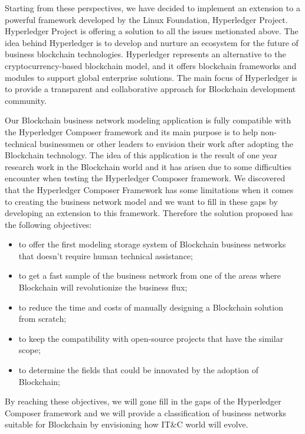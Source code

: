Starting from these perspectives, we have decided to implement an extension to a powerful framework developed by the Linux Foundation, Hyperledger Project.
Hyperledger Project is offering a solution to all the issues metionated above. The idea behind Hyperledger is to develop and nurture an ecosystem for the future of business blockchain technologies.
Hyperledger represents an alternative to the cryptocurrency-based blockchain model, and it offers blockchain frameworks and modules to support global enterprise solutions. The main focus of Hyperledger is to provide a transparent and collaborative approach for Blockchain development community.

Our Blockchain business network modeling application is fully compatible with the Hyperledger Composer framework and its main purpose is to help non-technical businessmen or other leaders to envision their work after adopting the Blockchain technology.
The idea of this application is the result of one year research work in the Blockchain world and it has arisen due to some difficulties encounter when testing the Hyperledger Composer framework.
We discovered that the Hyperledger Composer Framework has some limitations when it comes to creating the business network model and we want to fill in these gaps by developing an extension to this framework.
Therefore the solution proposed has the following objectives:
\begin{itemize}
	\item to offer the first modeling storage system of Blockchain business networks that doesn't require human technical assistance; 
	\item to get a fast sample of the business network from one of the areas where Blockchain will revolutionize the business flux;
	\item to reduce the time and costs of manually designing a Blockchain solution from scratch;
	\item to keep the compatibility with open-source projects that have the similar scope;
	\item to determine the fields that could be innovated by the adoption of Blockchain;
\end{itemize}  

By reaching these objectives, we will gone fill in the gaps of the Hyperledger Composer framework and we will provide a classification of business networks suitable for Blockchain by envisioning how IT\&C world will evolve. 

